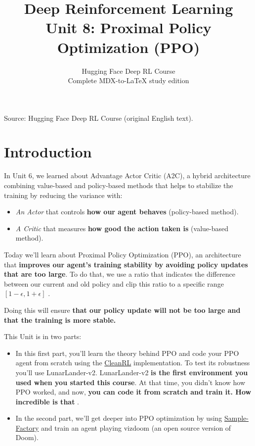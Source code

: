 \documentclass[11pt,a4paper]{article}
\title{\textbf{Deep Reinforcement Learning}\\[0.35em]\large Unit 8: Proximal Policy Optimization (PPO)}
\author{Hugging Face Deep RL Course\\\small Complete MDX-to-\LaTeX{} study edition}
\date{}
\begin{document}
\maketitle
\vspace{-0.8em}
\begin{center}\small\color{secondary}Source: Hugging Face Deep RL Course (original English text).\end{center}
\begingroup\small\setlength{\parskip}{0pt}\tableofcontents\endgroup
\vspace{0.5em}
\clearpage

\section{Introduction}\label{introduction}


In Unit 6, we learned about Advantage Actor Critic (A2C), a hybrid architecture combining value-based and policy-based methods that helps to stabilize the training by reducing the variance with:

\begin{itemize}
\tightlist
\item
  \emph{An Actor} that controls \textbf{how our agent behaves} (policy-based method).
\item
  \emph{A Critic} that measures \textbf{how good the action taken is} (value-based method).
\end{itemize}

Today we'll learn about Proximal Policy Optimization (PPO), an architecture that \textbf{improves our agent's training stability by avoiding policy updates that are too large}. To do that, we use a ratio that indicates the difference between our current and old policy and clip this ratio to a specific range \([1 - \epsilon, 1 + \epsilon]\) .

Doing this will ensure \textbf{that our policy update will not be too large and that the training is more stable.}

This Unit is in two parts:

\begin{itemize}
\tightlist
\item
  In this first part, you'll learn the theory behind PPO and code your PPO agent from scratch using the \href{https://github.com/vwxyzjn/cleanrl}{CleanRL} implementation. To test its robustness you'll use LunarLander-v2. LunarLander-v2 \textbf{is the first environment you used when you started this course}. At that time, you didn't know how PPO worked, and now, \textbf{you can code it from scratch and train it. How incredible is that }.
\item
  In the second part, we'll get deeper into PPO optimization by using \href{https://samplefactory.dev/}{Sample-Factory} and train an agent playing vizdoom (an open source version of Doom).
\end{itemize}
\end{document}
